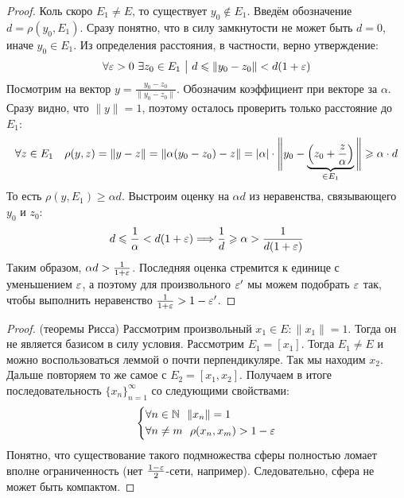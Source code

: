\begin{proof}
	Коль скоро $E_1 \neq E$, то существует $y_0 \notin E_1$. Введём обозначение $d = \rho(y_0, E_1)$. Сразу понятно, что в силу замкнутости не может быть $d = 0$, иначе $y_0 \in E_1$. Из определения расстояния, в частности, верно утверждение:
	\[
		\forall \varepsilon > 0\ \exists z_0 \in E_1 \ \big|\  d \leqslant \|y_0 - z_0\| < d(1 + \varepsilon)
	\]
	Посмотрим на вектор $y = \frac{y_0 - z_0}{\|y_0 - z_0\|}$. Обозначим коэффициент при векторе за $\alpha$. Сразу видно, что $\|y\| = 1$, поэтому осталось проверить только расстояние до $E_1$:
	\[
		\forall z \in E_1\quad \rho(y, z) = \|y - z\| = \|\alpha(y_0 - z_0) - z\| = |\alpha| \cdot \Bigg\|y_0 - \underbrace{\left(z_0 + \frac{z}{\alpha}\right)}_{\in E_1}\Bigg\| \geqslant \alpha \cdot d
	\]
	То есть $\rho(y, E_1) \ge \alpha d$. Выстроим оценку на $\alpha d$ из неравенства, связывающего $y_0$ и $z_0$:
	\[
		d \leqslant \frac{1}{\alpha} < d(1 + \varepsilon) \Longrightarrow \frac{1}{d} \geqslant \alpha > \frac{1}{d(1 + \varepsilon)}
	\]
	Таким образом, $\alpha d > \frac{1}{1 + \varepsilon}$. Последняя оценка стремится к единице с уменьшением $\varepsilon$, а поэтому для произвольного $\varepsilon'$ мы можем подобрать $\varepsilon$ так, чтобы выполнить неравенство $\frac{1}{1 + \varepsilon} > 1 - \varepsilon'$.
\end{proof}

\begin{proof} (теоремы Рисса)
	Рассмотрим произвольный $x_1 \in E\colon \|x_1\| = 1$. Тогда он не является базисом в силу условия. Рассмотрим $E_1 = [x_1]$. Тогда $E_1 \neq E$ и можно воспользоваться леммой о почти перпендикуляре. Так мы находим $x_2$. Дальше повторяем то же самое с $E_2 = [x_1, x_2]$. Получаем в итоге последовательность $\{x_n\}_{n = 1}^\infty$ со следующими свойствами:
	\[
		\left\{ \begin{aligned} 
			&{\forall n \in \mathbb{N}\ \ \|x_n\| = 1}
			\\
			&{\forall n \neq m\ \ \rho(x_n, x_m) > 1 - \varepsilon}
		 \end{aligned} \right.
	\]
	Понятно, что существование такого подмножества сферы полностью ломает вполне ограниченность (нет $\frac{1 - \varepsilon}{2}$-сети, например). Следовательно, сфера не может быть компактом.
\end{proof}
